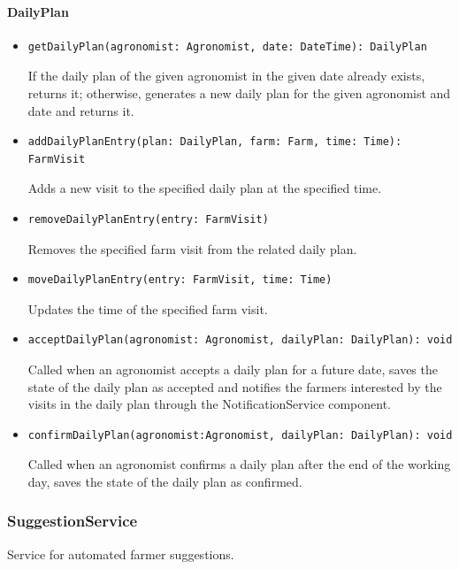 \documentclass{article}
\begin{document}
\paragraph{DailyPlan}
\begin{itemize}
\item \begin{verbatim}
getDailyPlan(agronomist: Agronomist, date: DateTime): DailyPlan
\end{verbatim}
If the daily plan of the given agronomist in the given date already exists, returns it; otherwise, generates a new daily plan for the given agronomist and date and returns it.
\item \begin{verbatim}
addDailyPlanEntry(plan: DailyPlan, farm: Farm, time: Time): FarmVisit
\end{verbatim}
Adds a new visit to the specified daily plan at the specified time.
\item \begin{verbatim}
removeDailyPlanEntry(entry: FarmVisit)
\end{verbatim}
Removes the specified farm visit from the related daily plan.
\item \begin{verbatim}
moveDailyPlanEntry(entry: FarmVisit, time: Time)
\end{verbatim}
Updates the time of the specified farm visit.
\item \begin{verbatim}
acceptDailyPlan(agronomist: Agronomist, dailyPlan: DailyPlan): void
\end{verbatim}
Called when an agronomist accepts a daily plan for a future date, saves the state of the daily plan as accepted and notifies the farmers interested by the visits in the daily plan through the NotificationService component.
\item\begin{verbatim}
confirmDailyPlan(agronomist:Agronomist, dailyPlan: DailyPlan): void
\end{verbatim}
Called when an agronomist confirms a daily plan after the end of the working day, saves the state of the daily plan as confirmed.
\end{itemize}

\subsubsection{SuggestionService}
Service for automated farmer suggestions.
\end{document}
